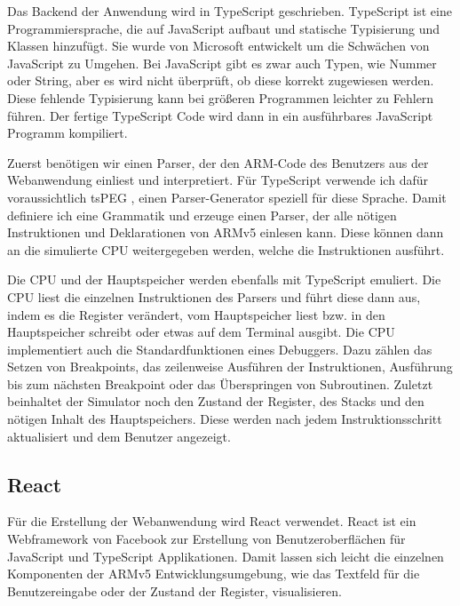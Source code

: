 \documentclass[a4paper, 11pt, onecolumn]{article}
\begin{document}
Das Backend der Anwendung wird in TypeScript geschrieben. TypeScript \cite{typescript} ist eine Programmiersprache, die auf JavaScript aufbaut und statische Typisierung und Klassen hinzufügt. Sie wurde von Microsoft entwickelt um die Schwächen von JavaScript zu Umgehen. Bei JavaScript gibt es zwar auch Typen, wie Nummer oder String, aber es wird nicht überprüft, ob diese korrekt zugewiesen werden. Diese fehlende Typisierung kann bei größeren Programmen leichter zu Fehlern führen. Der fertige TypeScript Code wird dann in ein ausführbares JavaScript Programm kompiliert.

Zuerst benötigen wir einen Parser, der den ARM-Code des Benutzers aus der Webanwendung einliest und interpretiert. Für TypeScript verwende ich dafür voraussichtlich tsPEG \cite{tspeg}, einen Parser-Generator speziell für diese Sprache. Damit definiere ich eine Grammatik und erzeuge einen Parser, der alle nötigen Instruktionen und Deklarationen von ARMv5 einlesen kann. Diese können dann an die simulierte CPU weitergegeben werden, welche die Instruktionen ausführt.

Die CPU und der Hauptspeicher werden ebenfalls mit TypeScript emuliert. Die CPU liest die einzelnen Instruktionen des Parsers und führt diese dann aus, indem es die Register verändert, vom Hauptspeicher liest bzw. in den Hauptspeicher schreibt oder etwas auf dem Terminal ausgibt. Die CPU implementiert auch die Standardfunktionen eines Debuggers. Dazu zählen das Setzen von Breakpoints, das zeilenweise Ausführen der Instruktionen, Ausführung bis zum nächsten Breakpoint oder das Überspringen von Subroutinen. Zuletzt beinhaltet der Simulator noch den Zustand der Register, des Stacks und den nötigen Inhalt des Hauptspeichers. Diese werden nach jedem Instruktionsschritt aktualisiert und dem Benutzer angezeigt.

\subsection{React}

Für die Erstellung der Webanwendung wird React verwendet. React \cite{react} ist ein Webframework von Facebook zur Erstellung von Benutzeroberflächen für JavaScript und TypeScript Applikationen. Damit lassen sich leicht die einzelnen Komponenten der ARMv5 Entwicklungsumgebung, wie das Textfeld für die Benutzereingabe oder der Zustand der Register, visualisieren.
\end{document}
